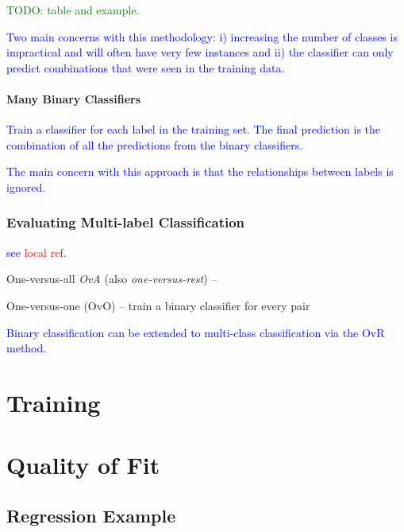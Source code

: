 \textcolor{green}{TODO: table and example.}

\textcolor{blue}{Two main concerns with this methodology: i) increasing the number of classes is impractical and will often have very few instances and ii) the classifier can only predict combinations that were seen in the training data.}

\paragraph{Many Binary Classifiers}

\textcolor{blue}{Train a classifier for each label in the training set. The final prediction is the combination of all the predictions from the binary classifiers.}

\textcolor{blue}{The main concern with this approach is that the relationships between labels is ignored.}

\subsubsection{Evaluating Multi-label Classification}

\textcolor{blue}{see \textcolor{red}{local ref}.}

One-versus-all \emph{OvA} (also \emph{one-versus-rest}) -- 

One-versus-one (OvO) -- train a binary classifier for every pair


\textcolor{blue}{Binary classification can be extended to multi-class classification via the OvR method.}


\section{Training}

\section{Quality of Fit}


\subsection{Regression Example}

